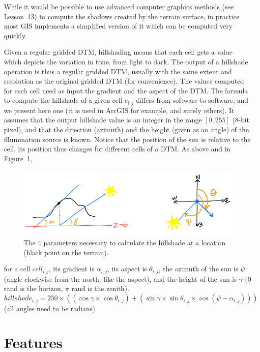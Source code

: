 While it would be possible to use advanced computer graphics methods (see Lesson~13) to compute the shadows created by the terrain surface, in practice most GIS implements a simplified version of it which can be computed very quickly.

Given a regular gridded DTM, hillshading means that each cell gets a value which depicts the variation in tone, from light to dark.
The output of a hillshade operation is thus a regular gridded DTM, usually with the same extent and resolution as the original gridded DTM (for convenience).
The values computed for each cell need as input the gradient and the aspect of the DTM\@.
The formula to compute the hillshade of a given cell $c_{i,j}$ differs from software to software, and we present here one (it is used in ArcGIS for example, and surely others).
It assumes that the output hillshade value is an integer in the range $[0,255]$ (8-bit pixel), and that the direction (azimuth) and the height (given as an angle) of the illumination source is known.
Notice that the position of the sun is relative to the cell, its position thus changes for different cells of a DTM\@.
As above and in Figure~\ref{fig:hillshade-params}, 
\begin{figure}
  \centering
  \includegraphics[width=0.95\linewidth]{figs/hillshade-params}
  \caption{The 4 parameters necessary to calculate the hillshade at a location (black point on the terrain).}
\label{fig:hillshade-params}
\end{figure}
for a cell $cell_{i,j}$, its gradient is $\alpha_{i,j}$, its aspect is $\theta_{i,j}$, the azimuth of the sun is $\psi$ (angle clockwise from the north, like the aspect), and the height of the sun is $\gamma$ (0 rand is the horizon, $\pi$ rand is the zenith).
\[
  hillshade_{i,j} = 250 \times ((\cos\gamma \times \cos\theta_{i,j}) + (\sin\gamma \times \sin\theta_{i,j} \times \cos (\psi - \alpha_{i,j}))) 
\]
(all angles need to be radians)



%
\section{Features}


